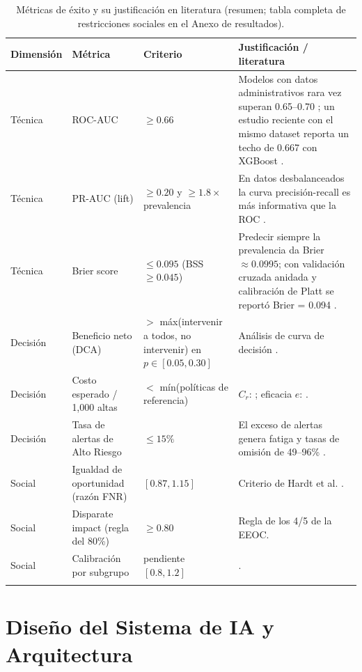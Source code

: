 \documentclass[11pt,a4paper]{article}
\begin{document}
\begin{longtable}{p{1.6cm}p{2.6cm}p{3.2cm}p{6cm}}
\toprule
\textbf{Dimensión} & \textbf{Métrica} & \textbf{Criterio} & \textbf{Justificación / literatura} \\
\midrule
\endhead
Técnica & ROC-AUC & $\geq 0.66$ & Modelos con datos administrativos rara vez superan 0.65--0.70 \cite{kansagara2011}; un estudio reciente con el mismo dataset reporta un techo de 0.667 con XGBoost \cite{emijohnson2025}. \\
Técnica & PR-AUC (lift) & $\geq 0.20$ y $\geq 1.8\times$ prevalencia & En datos desbalanceados la curva precisión-recall es más informativa que la ROC \cite{saito2015}. \\
Técnica & Brier score & $\leq 0.095$ (BSS $\geq 0.045$) & Predecir siempre la prevalencia da Brier $\approx 0.0995$; con validación cruzada anidada y calibración de Platt se reportó Brier = 0.094 \cite{salim2026}. \\
Decisión & Beneficio neto (DCA) & $>$ máx(intervenir a todos, no intervenir) en $p\in[0.05,0.30]$ & Análisis de curva de decisión \cite{vickers2006}. \\
Decisión & Costo esperado / 1,000 altas & $<$ mín(políticas de referencia) & $C_r$: \cite{ghabowen2024}; eficacia $e$: \cite{leppin2014,drincic2017}. \\
Decisión & Tasa de alertas de Alto Riesgo & $\leq 15\%$ & El exceso de alertas genera fatiga y tasas de omisión de 49--96\% \cite{vandersijs2006,ancker2017}. \\
Social & Igualdad de oportunidad (razón FNR) & $[0.87, 1.15]$ & Criterio de Hardt et al. \cite{hardt2016}. \\
Social & Disparate impact (regla del 80\%) & $\geq 0.80$ & Regla de los 4/5 de la EEOC. \\
Social & Calibración por subgrupo & pendiente $[0.8,1.2]$ & \cite{vancalster2019,chouldechova2017}. \\
\bottomrule
\caption{Métricas de éxito y su justificación en literatura (resumen; tabla completa de restricciones sociales en el Anexo de resultados).}
\label{tab:metricas-exito}
\end{longtable}

\section{Diseño del Sistema de IA y Arquitectura}
\end{document}
